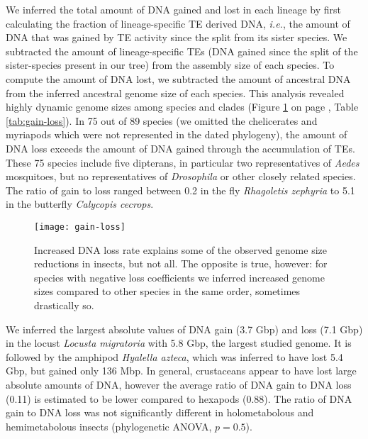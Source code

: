 We inferred the total amount of DNA gained and lost in each lineage by
first calculating the fraction of lineage-specific TE derived DNA,
\emph{i.e.}, the amount of DNA that was gained by TE activity since the
split from its sister species. We subtracted the amount of
lineage-specific TEs (DNA gained since the split of the sister-species
present in our tree) from the assembly size of each species. To compute
the amount of DNA lost, we subtracted the amount of ancestral DNA from
the inferred ancestral genome size of each species. This analysis
revealed highly dynamic genome sizes among species and clades (Figure
\ref{fig:gain-loss} on page \pageref{fig:gain-loss},
Table \ref{tab:gain-loss}). In 75 out of 89 species (we omitted the chelicerates and
myriapods which were not represented in the dated phylogeny), the amount
of DNA loss exceeds the amount of DNA gained through the accumulation of
TEs. These 75 species include five dipterans, in particular two
representatives of \emph{Aedes} mosquitoes, but no representatives of
\emph{Drosophila} or other closely related species. The ratio of gain to
loss ranged between 0.2 in the fly \emph{Rhagoletis zephyria} to 5.1 in
the butterfly \emph{Calycopis cecrops}.

\begin{figure}[h!]
\begin{center}
\texttt{[image: gain-loss]}
\caption[DNA gain and loss rates]{{Increased DNA loss rate explains some of the observed genome size
reductions in insects, but not all. The opposite is true, however: for
species with negative loss coefficients we inferred increased genome
sizes compared to other species in the same order, sometimes drastically
so.
{\label{fig:gain-loss}}%
}}
\end{center}
\end{figure}

We inferred the largest absolute values of DNA gain (3.7 Gbp) and loss
(7.1 Gbp) in the locust \emph{Locusta migratoria} with 5.8 Gbp, the
largest studied genome. It is followed by the amphipod \emph{Hyalella
azteca}, which was inferred to have lost 5.4 Gbp, but gained only 136
Mbp. In general, crustaceans appear to have lost large absolute amounts
of DNA, however the average ratio of DNA gain to DNA loss (0.11) is
estimated to be lower compared to hexapods (0.88). The ratio of DNA gain
to DNA loss was not significantly different in holometabolous and
hemimetabolous insects (phylogenetic ANOVA, \(p = 0.5\)).

